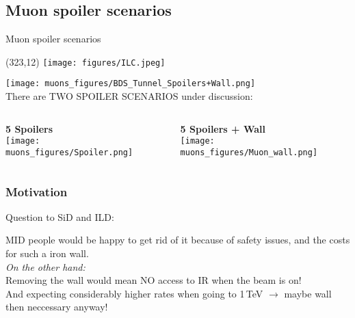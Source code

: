 \documentclass[xcolor={dvipsnames}]{beamer}
\newcommand{\ilclogo}{
  \setlength{\TPHorizModule}{1pt}
  \setlength{\TPVertModule}{1pt}
  \begin{textblock}{1}(323,12)
   \texttt{[image: figures/ILC.jpeg]}
  \end{textblock}
}
\begin{document}
\subsection{Muon spoiler scenarios}
\begin{frame}{Muon spoiler scenarios}
\ilclogo
\centering\texttt{[image: muons\_figures/BDS\_Tunnel\_Spoilers+Wall.png]}\\
{There are TWO SPOILER SCENARIOS under discussion:}
\begin{columns}[T]
 \begin{column}{0.5\textwidth}
 \centering \textbf{5 Spoilers}\\
 \texttt{[image: muons\_figures/Spoiler.png]}
 \end{column}
 \begin{column}{0.5\textwidth}
  \centering \textbf{5 Spoilers + Wall}\\
  \texttt{[image: muons\_figures/Muon\_wall.png]}
 \end{column}
\end{columns}
\end{frame}

\subsubsection{Motivation}
\begin{frame}{}
Question to SiD and ILD:

\begin{center}
\end{center}
MID people would be happy to get rid of it because of safety issues, and the costs for such a iron wall.\\
\textit{On the other hand:}\\
\alert{Removing the wall would mean NO access to IR when the beam is on!\\
And expecting considerably higher rates when going to 1\,TeV $\rightarrow$ maybe wall then neccessary anyway!}
\end{frame}


\setcounter{tocdepth}{3}
\end{document}
